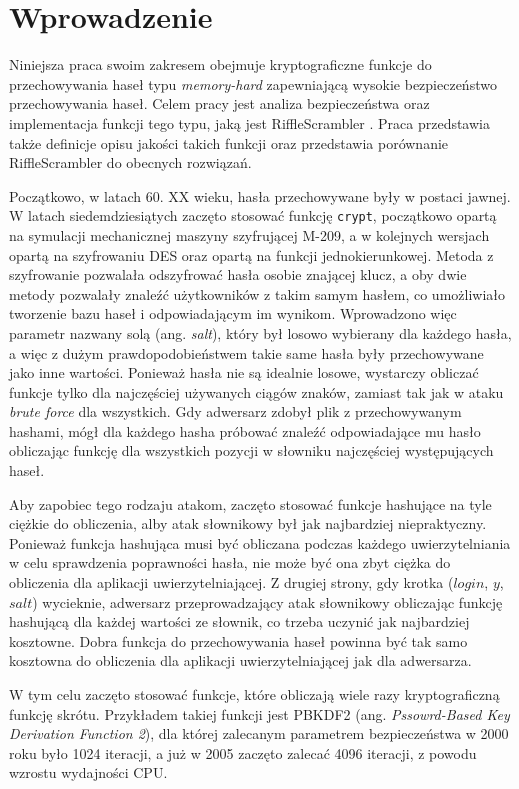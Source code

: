 \chapter{Wprowadzenie}
\thispagestyle{chapterBeginStyle}


Niniejsza praca swoim zakresem obejmuje kryptograficzne funkcje do przechowywania haseł typu \textit{memory-hard} zapewniającą wysokie bezpieczeństwo przechowywania haseł.
Celem pracy jest analiza bezpieczeństwa oraz implementacja funkcji tego typu, jaką jest RiffleScrambler \cite{rs}. Praca przedstawia także definicje opisu jakości takich funkcji oraz przedstawia porównanie RiffleScrambler do obecnych rozwiązań.

Początkowo, w latach 60. XX wieku, hasła przechowywane były w postaci jawnej.
W latach siedemdziesiątych zaczęto stosować funkcję \texttt{crypt}, początkowo opartą na symulacji mechanicznej maszyny szyfrującej M-209, a w kolejnych wersjach opartą na szyfrowaniu DES oraz opartą na funkcji jednokierunkowej. Metoda z szyfrowanie pozwalała odszyfrować hasła osobie znającej klucz, a oby dwie metody pozwalały znaleźć użytkowników z takim samym hasłem, co umożliwiało tworzenie bazu haseł i odpowiadającym im wynikom.
Wprowadzono więc parametr nazwany solą (ang. \textit{salt}), który był losowo wybierany dla każdego hasła, a więc z dużym prawdopodobieństwem takie same hasła były przechowywane jako inne wartości.
Ponieważ hasła nie są idealnie losowe, wystarczy obliczać funkcje tylko dla najczęściej używanych ciągów znaków, zamiast tak jak w ataku \textit{brute force} dla wszystkich.
Gdy adwersarz zdobył plik z przechowywanym hashami, mógł dla każdego hasha próbować znaleźć odpowiadające mu hasło obliczając funkcję dla wszystkich pozycji w słowniku najczęściej występujących haseł.

Aby zapobiec tego rodzaju atakom, zaczęto stosować funkcje hashujące na tyle ciężkie do obliczenia, alby atak słownikowy był jak najbardziej niepraktyczny. 
Ponieważ funkcja hashująca musi być obliczana podczas każdego uwierzytelniania w celu sprawdzenia poprawności hasła, nie może być ona zbyt ciężka do obliczenia dla aplikacji uwierzytelniającej.
Z drugiej strony, gdy krotka ($login$, $y$, $salt$) wycieknie, adwersarz przeprowadzający atak słownikowy obliczając funkcję hashującą dla każdej wartości ze słownik, co trzeba uczynić jak najbardziej kosztowne.
Dobra funkcja do przechowywania haseł powinna być tak samo kosztowna do obliczenia dla aplikacji uwierzytelniającej jak dla adwersarza.

W tym celu zaczęto stosować funkcje, które obliczają wiele razy kryptograficzną funkcję skrótu. Przykładem takiej funkcji jest PBKDF2 \cite{pbkdf2} (ang. \textit{Pssowrd-Based Key Derivation Function 2}), dla której zalecanym parametrem bezpieczeństwa w 2000 roku było 1024 iteracji, a już w 2005 zaczęto zalecać 4096 iteracji, z powodu wzrostu wydajności CPU.

